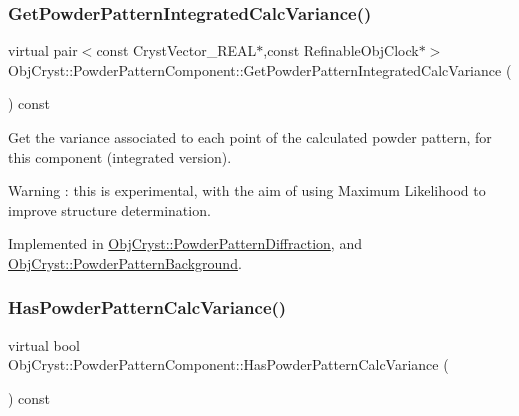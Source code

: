 \subsubsection{\texorpdfstring{GetPowderPatternIntegratedCalcVariance()}{GetPowderPatternIntegratedCalcVariance()}}
{\footnotesize\ttfamily virtual pair$<$const Cryst\+Vector\+\_\+\+R\+E\+AL$\ast$,const Refinable\+Obj\+Clock$\ast$$>$ Obj\+Cryst\+::\+Powder\+Pattern\+Component\+::\+Get\+Powder\+Pattern\+Integrated\+Calc\+Variance (\begin{DoxyParamCaption}{ }\end{DoxyParamCaption}) const\hspace{0.3cm}{\ttfamily [pure virtual]}}

Get the variance associated to each point of the calculated powder pattern, for this component (integrated version).

\begin{DoxyWarning}{Warning}
\+: this is experimental, with the aim of using Maximum Likelihood to improve structure determination. 
\end{DoxyWarning}


Implemented in \mbox{\hyperlink{class_obj_cryst_1_1_powder_pattern_diffraction_a0af11c8ffb08972bcc13b71fd531071a}{Obj\+Cryst\+::\+Powder\+Pattern\+Diffraction}}, and \mbox{\hyperlink{class_obj_cryst_1_1_powder_pattern_background_a8ccebd7f0a71a7994c60b6efb2b8ebc7}{Obj\+Cryst\+::\+Powder\+Pattern\+Background}}.

\mbox{\label{class_obj_cryst_1_1_powder_pattern_component_a773d077df9d066f3d15631ec84ca15fd}} 
\subsubsection{\texorpdfstring{HasPowderPatternCalcVariance()}{HasPowderPatternCalcVariance()}}
{\footnotesize\ttfamily virtual bool Obj\+Cryst\+::\+Powder\+Pattern\+Component\+::\+Has\+Powder\+Pattern\+Calc\+Variance (\begin{DoxyParamCaption}{ }\end{DoxyParamCaption}) const\hspace{0.3cm}{\ttfamily [pure virtual]}}

